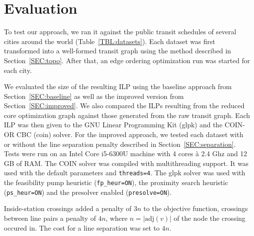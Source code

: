 \documentclass{llncs}
\begin{document}
%
\section{Evaluation}
%

To test our approach, we ran it against the public transit schedules of several cities around the world (Table~\ref{TBL:datasets}). Each dataset was first transformed into a well-formed transit graph using the method described in Section~\ref{SEC:topo}. After that, an edge ordering optimization run was started for each city.

We evaluated the size of the resulting ILP using the baseline approach from Section~\ref{SEC:baseline} as well as the improved version from Section~\ref{SEC:improved}. We also compared the ILPs resulting from the reduced core optimization graph against those generated from the raw transit graph. Each ILP was then given to the GNU Linear Programming Kit (glpk) and the COIN-OR CBC (coin) solver. For the improved approach, we tested each dataset with or without the line separation penalty described in Section~\ref{SEC:separation}. Tests were run on an Intel Core i5-6300U machine with 4 cores \`{a} 2.4 Ghz and 12 GB of RAM. The COIN solver was compiled with multithreading support. It was used with the default parameters and \texttt{threads=4}. The glpk solver was used with the feasibility pump heuristic (\texttt{fp\_heur=ON}), the proximity search heuristic (\texttt{ps\_heur=ON}) and the presolver enabled (\texttt{presolve=ON}).

Inside-station crossings added a penalty of $3n$ to the objective function, crossings between line pairs a penalty of $4n$, where $n = |\text{adj}(v)|$ of the node the crossing occured in. The cost for a line separation was set to $4n$.

\renewcommand{\thefootnote}{\fnsymbol{footnote}}
\end{document}

